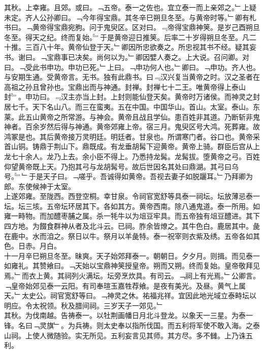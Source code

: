 \documentclass{zhvt-classic}
\begin{document}
\hspace*{2em}其秋。上幸雍。且郊。或曰。﹁五帝。泰一之佐也。宜立泰一而上亲郊之。﹂上疑未定。齐人公孙卿曰。﹁今年得宝鼎。其冬辛巳朔旦冬至。与黄帝时等。﹂卿有札书曰。﹁黄帝得宝鼎宛朐。问于鬼臾区。区对曰。﹃帝得宝鼎神䇲。是岁己酉朔旦冬至。得天之纪。终而复始。﹄于是黄帝迎日推䇲。后率二十岁得朔旦冬至。凡二十推。三百八十年。黄帝仙登于天。﹂卿因所忠欲奏之。所忠视其书不经。疑其妄书。谢曰。﹁宝鼎事已决矣。尚何以为。﹂卿因嬖人奏之。上大说。召问卿。对曰。﹁受此书申功。申功已死。﹂上曰。﹁申功何人也。﹂卿曰。﹁申功。齐人也。与安期生通。受黄帝言。无书。独有此鼎书。曰﹃汉兴复当黄帝之时。汉之圣者在高祖之孙且曾孙也。宝鼎出而与神通。封禅。封禅七十二王。唯黄帝得上泰山封﹄。申功曰。﹃汉主亦当上封。上封则能仙登天矣。黄帝时万诸侯。而神灵之封居七千。天下名山八。而三在蛮夷。五在中国。中国华山。首山。太室。泰山。东莱。此五山黄帝之所常游。与神会。黄帝且战且学仙。患百姓非其道。乃断斩非鬼神者。百余岁然后得与神通。黄帝郊雍上帝。宿三月。鬼臾区号大鸿。死葬雍。故鸿冢是也。其后黄帝接万灵明廷。明廷者。甘泉也。所谓寒门者。谷口也。黄帝采首山铜。铸鼎于荆山下。鼎既成。有龙垂胡髯下迎黄帝。黄帝上骑。群臣后宫从上龙七十余人。龙乃上去。余小臣不得上。乃悉持龙髯。龙髯拔。堕黄帝之弓。百姓仰望黄帝既上天。乃抱其弓与龙胡髯号。故后世因名其处曰鼎湖。其弓曰乌号。﹄﹂于是天子曰。﹁嗟乎。吾诚得如黄帝。吾视去妻子如脱躧耳。﹂乃拜卿为郎。东使候神于太室。\\
\hspace*{2em}上遂郊雍。至陇西。西登空桐。幸甘泉。令祠官宽舒等具泰一祠坛。坛放薄忌泰一坛。坛三垓。五帝坛环居其下。各如其方。黄帝西南。除八通鬼道。泰一所用。如雍一畤物。而加醴枣脯之属。杀一牦牛以为俎豆牢具。而五帝独有俎豆醴进。其下四方地。为餟食群神从者及北斗云。已祠。胙余皆燎之。其牛色白。鹿居其中。彘在鹿中。水而洎之。祭日以牛。祭月以羊彘特。泰一祝宰则衣紫及绣。五帝各如其色。日赤。月白。\\
\hspace*{2em}十一月辛巳朔旦冬至。昧爽。天子始郊拜泰一。朝朝日。夕夕月。则揖。而见泰一如雍礼。其赞飨曰。﹁天始以宝鼎神䇲授皇帝。朔而又朔。终而复始。皇帝敬拜见焉。﹂而衣上黄。其祠列火满坛。坛旁烹炊具。有司云。﹁祠上有光焉。﹂公卿言。﹁皇帝始郊见泰一云阳。有司奉瑄玉嘉牲荐飨。是夜有美光。及昼。黄气上属天。﹂太史公。祠官宽舒等曰。﹁神灵之休。祐福兆祥。宜因此地光域立泰畤坛以明应。令太祝领。秋及腊间祠。三岁天子一郊见。﹂\\
\hspace*{2em}其秋。为伐南越。告祷泰一。以牡荆画幡日月北斗登龙。以象天一三星。为泰一锋。名曰﹁灵旗﹂。为兵祷。则太史奉以指所伐国。而五利将军使不敢入海。之泰山祠。上使人微随验。实无所见。五利妄言见其师。其方尽。多不雠。上乃诛五利。\\
\end{document}
